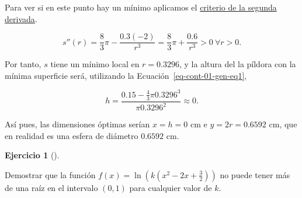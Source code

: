 \documentclass[
  a4paper,
]{scrreport}
\theoremstyle{definition}
\newtheorem{exercise}{Ejercicio}[chapter]
\theoremstyle{remark}
\begin{document}
\begin{tcolorbox}
Para ver si en este punto hay un mínimo aplicamos el
\href{https://aprendeconalf.es/analisis-manual/derivadas.html\#thm-concavidad}{criterio
de la segunda derivada}.

\[
s''(r) = \frac{8}{3}\pi -\frac{0.3(-2)}{r^3} =\frac{8}{3}\pi+\frac{0.6}{r^3} >0\ \forall r>0.
\]

Por tanto, \(s\) tiene un mínimo local en \(r=0.3296\), y la altura del
la píldora con la mínima superficie será, utilizando la
Ecuación~\ref{eq-cont-01-gen-eq1},

\[h =\frac{0.15-\frac{4}{3}\pi 0.3296^3}{\pi 0.3296^2}\approx 0.\]

Así pues, las dimensiones óptimas serían \(x=h=0\) cm e \(y=2r=0.6592\)
cm, que en realidad es una esfera de diámetro \(0.6592\) cm.

\end{tcolorbox}

\leavevmode{}%
\begin{exercise}[]\label{exr-9}

Demostrar que la función
\(f(x)=\ln\left(k\left(x^2-2x+\frac{3}{2}\right)\right)\) no puede tener
más de una raíz en el intervalo \((0,1)\) para cualquier valor de \(k\).

\end{exercise}
\end{document}

